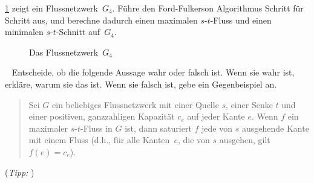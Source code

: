 \documentclass{uebung_cs}
\begin{document}
\begin{exercise}
    \cref{Figure_4} zeigt ein Flussnetzwerk~$G_4$.
    Führe den Ford-Fulkerson Algorithmus Schritt für Schritt aus, und berechne dadurch einen maximalen $s$-$t$-Fluss und einen minimalen $s$-$t$-Schnitt auf~$G_4$.
    
    \begin{figure}[ht]
	\begin{center}
		\caption{\label{Figure_4}Das Flussnetzwerk~$G_4$}
	\end{center}
\end{figure}
\end{exercise}

\begin{exercise}\
    Entscheide, ob die folgende Aussage wahr oder falsch ist. Wenn sie wahr ist, erkläre, warum sie das ist. Wenn sie falsch ist, gebe ein Gegenbeispiel an.
    \begin{quote}
        Sei $G$ ein beliebiges Flussnetzwerk mit einer Quelle $s$, einer Senke $t$ und einer positiven, ganzzahligen Kapazität $c_e$ auf jeder Kante $e$. Wenn $f$ ein maximaler $s$-$t$-Fluss in $G$ ist, dann saturiert $f$ jede von $s$ ausgehende Kante mit einem Fluss (d.h., für alle Kanten~$e$, die von $s$ ausgehen, gilt $f(e) = c_e$).
    \end{quote}
    (\emph{Tipp: })
\end{exercise}
\end{document}
